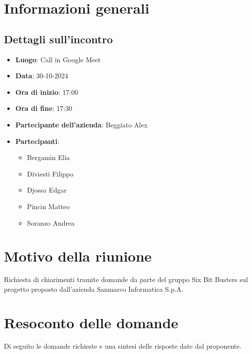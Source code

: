 \section{Informazioni generali}
\subsection{Dettagli sull'incontro}
\begin{itemize}
    \item \textbf{Luogo}: Call in Google Meet
    \item \textbf{Data}: 30-10-2024
    \item \textbf{Ora di inizio}: 17:00
    \item \textbf{Ora di fine}: 17:30
    \item \textbf{Partecipante dell'azienda}: Beggiato Alex
    \item \textbf{Partecipanti}:
    \begin{itemize}
        \item Bergamin Elia
        \item Diviesti Filippo
        \item Djossa Edgar
        \item Pincin Matteo 
        \item Soranzo Andrea  
    \end{itemize}
\end{itemize}

\section{Motivo della riunione}
Richiesta di chiarimenti tramite domande da parte del gruppo Six Bit Busters sul progetto proposto dall'azienda Sanmarco Informatica S.p.A.

\section{Resoconto delle domande}
Di seguito le domande richieste e una sintesi delle risposte date dal proponente.

